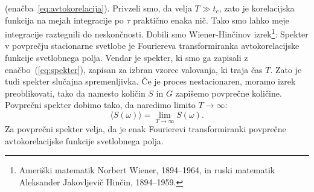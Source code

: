 (enačba~\ref{eq:avtokorelacija}). Privzeli smo, da velja $T\gg t_{c}$, zato je
korelacijska funkcija na mejah integracije po $\tau$ praktično enaka nič. Tako smo lahko 
meje integracije raztegnili do neskončnosti. Dobili smo 
Wiener-Hinčinov izrek\footnote{Ameriški matematik Norbert Wiener, 1894--1964, in 
ruski matematik Aleksander Jakovljevič Hinčin, 1894--1959.}:
Spekter v povprečju stacionarne svetlobe je Fouriereva transformiranka 
avtokorelacijske funkcije svetlobnega polja. 
Vendar je spekter, ki smo ga zapisali z enačbo~(\ref{eq:spekter}), zapisan za izbran 
vzorec valovanja, ki traja čas $T$. Zato je tudi spekter slučajna spremenljivka. Če je proces
nestacionaren, moramo izrek preoblikovati, tako da namesto količin $S$ in $G$ zapišemo
povprečne količine. Povprečni spekter dobimo tako, da naredimo
limito $T \rightarrow \infty$:
\begin{equation}
\langle S (\omega) \rangle = \lim_{T\to \infty}S(\omega).
\end{equation}
Za povprečni spekter velja, da je enak Fourierevi transformiranki 
povprečne avtokorelacijske funkcije svetlobnega polja.

